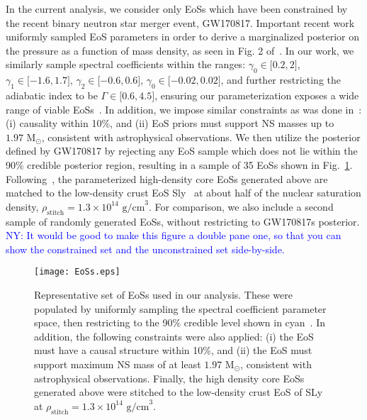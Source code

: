 \documentclass[prd,twocolumn,nofootinbib,superscriptaddress,amsmath,amssymb]{revtex4-1}
\newcommand{\ny}[1]{\textcolor{blue}{NY: #1} }
\begin{document}
In the current analysis, we consider only EoSs which have been constrained by the recent binary neutron star merger event, GW170817.
Important recent work~\cite{LIGO:posterior} uniformly sampled EoS parameters in order to derive a marginalized posterior on the pressure as a function of mass density, as seen in Fig. 2 of~\cite{LIGO:posterior}.
In our work, we similarly sample spectral coefficients within the ranges: $\gamma_0 \in \lbrack 0.2,2 \rbrack$, $\gamma_1 \in \lbrack -1.6,1.7 \rbrack$, $\gamma_2 \in \lbrack -0.6,0.6 \rbrack$, $\gamma_0 \in \lbrack -0.02,0.02 \rbrack$, and further restricting the adiabatic index to be $\Gamma \in \lbrack 0.6,4.5 \rbrack$, ensuring our parameterization exposes a wide range of viable EoSs~\cite{Lindblom:parameters}.
In addition, we impose similar constraints as was done in~\cite{LIGO:posterior}: (i) causality within 10\%, and (ii) EoS priors must support NS masses up to $1.97 \text{ M}_{\odot}$, consistent with astrophysical observations.
We then utilize the posterior defined by GW170817 by rejecting any EoS sample which does not lie within the 90\% credible posterior region, resulting in a sample of 35 EoSs shown in Fig.~\ref{fig:eos}.
Following~\cite{Read2009}, the parameterized high-density core EoSs generated above are matched to the low-density crust EoS Sly~\cite{Douchin:2001sv} at about half of the nuclear saturation density, $\rho_{\text{stitch}}=1.3 \times 10^{14} \text{ g/cm}^3$.
For comparison, we also include a second sample of randomly generated EoSs, without restricting to GW170817s posterior. {\ny{It would be good to make this figure a double pane one, so that you can show the constrained set and the unconstrained set side-by-side.}}
\begin{figure}
\begin{center} 
\texttt{[image: EoSs.eps]}
\end{center}
\caption{
Representative set of EoSs used in our analysis. 
These were populated by uniformly sampling the spectral coefficient parameter space, then restricting to the 90\% credible level shown in cyan~\cite{LIGO:posterior}.
In addition, the following constraints were also applied: (i) the EoS must have a causal structure within 10\%, and (ii) the EoS must support maximum NS mass of at least $1.97 \text{ M}_{\odot}$, consistent with astrophysical observations.
Finally, the high density core EoSs generated above were stitched to the low-density crust EoS of SLy~\cite{Douchin:2001sv} at $\rho_{\text{stitch}}=1.3 \times 10^{14} \text{ g/cm}^3$.
}
\label{fig:eos}
\end{figure} 
\end{document}
